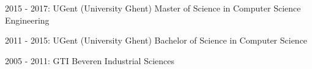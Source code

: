 


\begin{cventries}


\cventry
{2015 - 2017: UGent (University Ghent)} %
{Master of Science in Computer Science Engineering} %
{}
{}
{ %
}

\cventry
{2011 - 2015: UGent (University Ghent)} %
{Bachelor of Science in Computer Science} %
{}
{}
{ %
}

\cventry
{2005 - 2011: GTI Beveren} %
{Industrial Sciences} %
{}
{}
{ %
}


\end{cventries}